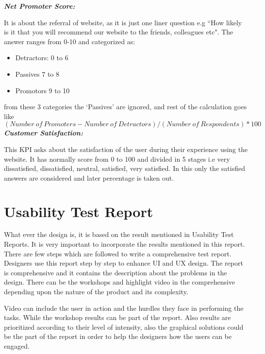\textbf{\emph{Net Promoter Score:}}\par
It is about the referral of website, as it is just one liner question e.g ``How likely is it that you will recommend our website to the friends, colleagues etc". The answer ranges from 0-10 and categorized as:
\begin{itemize}
\item Detractors: 0 to 6
\item Passives 7 to 8
\item Promotors 9 to 10
\end{itemize}
from these 3 categories the `Passives' are ignored, and rest of the calculation goes like \[ (Number\ of\ Promoters - Number\ of\ Detractors) / (Number\ of \ Respondents) *100\]
\textbf{\emph{Customer Satisfaction:}}\par
This KPI asks about the satisfaction of the user during their experience using the website. It has normally score from 0 to 100 and divided in 5 stages i.e very dissatisfied, dissatisfied, neutral, satisfied, very satisfied. In this only the satisfied answers are considered and later percentage is taken out.  
\section{Usability Test Report}
What ever the design is, it is based on the result mentioned in Usability Test Reports. It is very important to incorporate the results mentioned in this report. There are few steps which are followed to write a comprehensive test report. Designers use this report step by step to enhance UI and UX design. The report is comprehensive and it contains the description about the problems in the design. There can be the workshops and highlight video in the comprehensive depending upon the nature of the product and its complexity. \par
Video can include the user in action and the hurdles they face in performing the tasks. While the workshop results can be part of the report. Also results are prioritized according to their level of intensity, also the graphical solutions could be the part of the report in order to help the designers how the users can be engaged. 